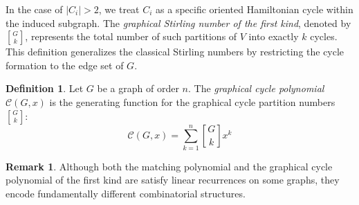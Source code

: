 \documentclass{amsart}
\theoremstyle{definition}
\newtheorem{definition}[theorem]{Definition}
\newtheorem{remark}[theorem]{Remark}
\begin{document}
In the case of $|C_i| > 2$, we treat $C_i$ as a specific oriented Hamiltonian cycle within the induced subgraph. The \textit{graphical Stirling number of the first kind}, denoted by ${G \brack k}$, represents the total number of such partitions of $V$ into exactly $k$ cycles. This definition generalizes the classical Stirling numbers by restricting the cycle formation to the edge set of $G$.
\begin{definition}
Let $G$ be a graph of order $n$. The \emph{graphical cycle polynomial} $\mathcal{C}(G, x)$ is the generating function for the graphical cycle partition numbers ${G \brack k}$:
\begin{equation*}
    \mathcal{C}(G, x) = \sum_{k=1}^{n} {G \brack k} x^k
\end{equation*}
\end{definition}
\begin{remark}
Although both the matching polynomial and the graphical cycle polynomial of the
first kind are  satisfy linear recurrences on some graphs,
they encode fundamentally different combinatorial structures.
\end{remark}
\end{document}
